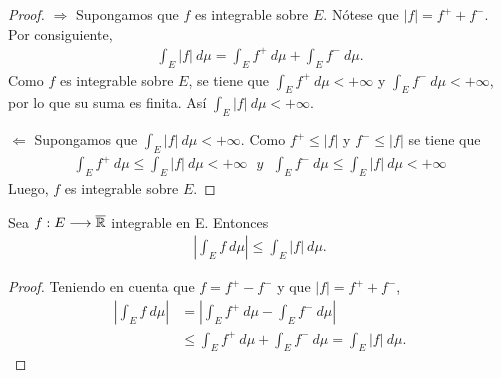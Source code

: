 \begin{proof}
    $\Longrightarrow$ Supongamos que $f$ es integrable sobre $E$. Nótese que $|f| = f^+ + f^-$. Por consiguiente,
    \begin{align*}
        \int_{E}{|f| \ d\mu} = \int_{E}{f^+  \ d\mu} + \int_{E}{f^-  \ d\mu}.
    \end{align*}
    Como $f$ es integrable sobre $E$, se tiene que $\int_{E}{f^+  \ d\mu} < +\infty$ y $\int_{E}{f^-  \ d\mu} < +\infty$, por lo que su suma es finita. Así $\int_{E}{|f|  \ d\mu} < +\infty$.

    $\Longleftarrow$ Supongamos que $\int_{E}{|f| \ d\mu} < +\infty$. Como $f^+ \leq |f|$ y $f^- \leq |f|$ se tiene que
    \begin{align*}
        \int_{E}{f^+ \ d\mu} \leq \int_{E}{|f| \ d\mu} < +\infty \ \ \ y \ \ \ \int_{E}{f^- \ d\mu} \leq \int_{E}{|f| \ d\mu} < +\infty
    \end{align*}
    Luego, $f$ es integrable sobre $E$.
\end{proof}

\begin{prop}
    Sea $f: E \longrightarrow \overline{\mathbb{R}}$ integrable en E. Entonces
    \begin{align*}
        \left| \int_{E}{f \ d\mu} \right| \leq \int_{E}{|f| \ d\mu}.
    \end{align*}
\end{prop}

\begin{proof}
    Teniendo en cuenta  que $f = f^+ - f^-$ y que $|f| = f^+ + f^-$,
    \begin{align*}
        \left| \int_{E}{f \ d\mu}\right| & = \left| \int_{E}{f^+ \ d\mu} - \int_{E}{f^- \ d\mu}\right|              \\
                                         & \leq \int_{E}{f^+ \ d\mu} + \int_{E}{f^- \ d\mu} = \int_{E}{|f| \ d\mu}.
    \end{align*}
\end{proof}

